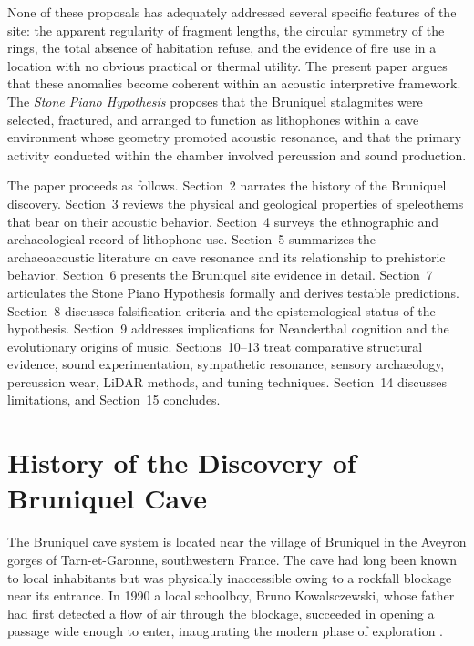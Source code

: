 \documentclass[12pt]{article}
\begin{document}
None of these proposals has adequately addressed several specific features of the site: the apparent regularity of fragment lengths, the circular symmetry of the rings, the total absence of habitation refuse, and the evidence of fire use in a location with no obvious practical or thermal utility. The present paper argues that these anomalies become coherent within an acoustic interpretive framework. The \textit{Stone Piano Hypothesis} proposes that the Bruniquel stalagmites were selected, fractured, and arranged to function as lithophones within a cave environment whose geometry promoted acoustic resonance, and that the primary activity conducted within the chamber involved percussion and sound production.

The paper proceeds as follows. Section~2 narrates the history of the Bruniquel discovery. Section~3 reviews the physical and geological properties of speleothems that bear on their acoustic behavior. Section~4 surveys the ethnographic and archaeological record of lithophone use. Section~5 summarizes the archaeoacoustic literature on cave resonance and its relationship to prehistoric behavior. Section~6 presents the Bruniquel site evidence in detail. Section~7 articulates the Stone Piano Hypothesis formally and derives testable predictions. Section~8 discusses falsification criteria and the epistemological status of the hypothesis. Section~9 addresses implications for Neanderthal cognition and the evolutionary origins of music. Sections~10--13 treat comparative structural evidence, sound experimentation, sympathetic resonance, sensory archaeology, percussion wear, LiDAR methods, and tuning techniques. Section~14 discusses limitations, and Section~15 concludes.

\section{History of the Discovery of Bruniquel Cave}

The Bruniquel cave system is located near the village of Bruniquel in the Aveyron gorges of Tarn-et-Garonne, southwestern France. The cave had long been known to local inhabitants but was physically inaccessible owing to a rockfall blockage near its entrance. In 1990 a local schoolboy, Bruno Kowalsczewski, whose father had first detected a flow of air through the blockage, succeeded in opening a passage wide enough to enter, inaugurating the modern phase of exploration \citep{Fage2019}.
\end{document}
